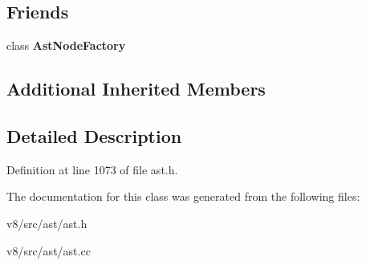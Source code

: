 \subsection*{Friends}
\begin{DoxyCompactItemize}
\item 
\mbox{\label{classv8_1_1internal_1_1Literal_a8d587c8ad3515ff6433eb83c578e795f}} 
class {\bfseries Ast\+Node\+Factory}
\end{DoxyCompactItemize}
\subsection*{Additional Inherited Members}


\subsection{Detailed Description}


Definition at line 1073 of file ast.\+h.



The documentation for this class was generated from the following files\+:\begin{DoxyCompactItemize}
\item 
v8/src/ast/ast.\+h\item 
v8/src/ast/ast.\+cc\end{DoxyCompactItemize}
